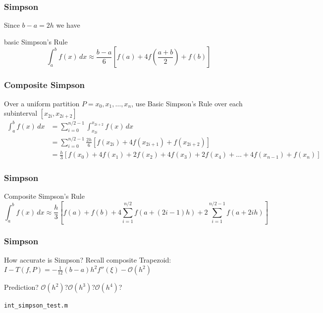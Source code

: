 \documentclass[10pt]{beamer}
\newcommand{\mO}{{\mathcal{O}}}
\begin{document}
\begin{frame}
\frametitle{Simpson}
Since $b-a=2h$ we have
\begin{block}{basic Simpson's Rule}
  \begin{equation*}
  \int_{a}^{b} f(x)\,dx \approx \frac{b-a}{6}\left[f(a) + 4f\left(\frac{a+b}{2}\right) + f(b)\right]
  \end{equation*}
\end{block}
\begin{center}
\end{center}
\end{frame}
\begin{frame}
\frametitle{Composite Simpson}
Over a uniform partition $P={x_0,x_1,\dots,x_n}$, use Basic Simpson's Rule over
each subinterval $[x_{2i},x_{2i+2}]$
  \begin{align*}
  \int_{a}^{b} f(x)\,dx & = \sum_{i=0}^{n/2-1} \int_{x_{2i}}^{x_{2i+2}} f(x)\,dx\\
                        & = \sum_{i=0}^{n/2-1} \frac{2h}{6}\left[f(x_{2i}) + 4f(x_{2i+1}) + f(x_{2i+2})\right]\\
                        & = \frac{h}{3}\left[f(x_{0}) + 4f(x_1) + 2f(x_2) + 4f(x_3) + 2f(x_4) + \dots + 4f(x_{n-1}) +f(x_{n})\right]
  \end{align*}
\end{frame}
\begin{frame}
\frametitle{Simpson}
\begin{block}{Composite Simpson's Rule}
  \begin{equation*}
  \int_{a}^{b} f(x)\,dx \approx \frac{h}{3}\left[f(a) + f(b) + 4 \sum_{i=1}^{n/2} f(a+(2i-1)h) + 2\sum_{i=1}^{n/2 - 1}f(a+2ih)\right]
  \end{equation*}
\end{block}
\begin{center}
\end{center}
\end{frame}
\begin{frame}
\frametitle{Simpson}
How accurate is Simpson?
\bigskip
Recall composite Trapezoid: $I - T(f,P) = -\frac{1}{12}(b-a)h^2f''(\xi) - \mO(h^2)$
\bigskip

Prediction? $\mO(h^2)$?\quad $\mO(h^3)$?\quad $\mO(h^4)$?
\bigskip

\texttt{int\_simpson\_test.m}
\end{frame}
\end{document}
